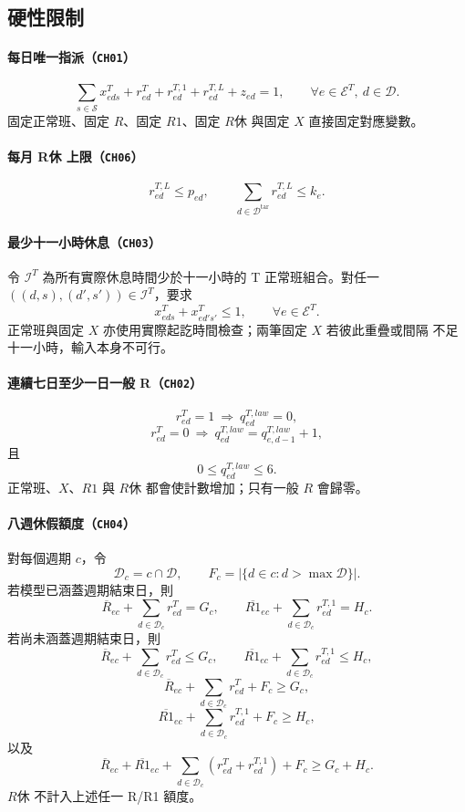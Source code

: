 \documentclass[a4paper,12pt]{article}
\begin{document}
\subsection{硬性限制}

\paragraph{每日唯一指派（\texttt{CH01}）}
\[
  \sum_{s\in\mathcal{S}}x^{T}_{eds}
  +r^{T}_{ed}+r^{T,1}_{ed}+r^{T,L}_{ed}+z_{ed}=1,
  \qquad
  \forall e\in\mathcal{E}^{T},\ d\in\mathcal{D}.
\]
固定正常班、固定 \(R\)、固定 \(R1\)、固定 \(R休\) 與固定 \(X\) 直接固定對應變數。

\paragraph{每月 R休 上限（\texttt{CH06}）}
\[
  r^{T,L}_{ed}\leq p_{ed},
  \qquad
  \sum_{d\in\mathcal{D}^{\mathrm{tar}}}r^{T,L}_{ed}\leq k_e.
\]

\paragraph{最少十一小時休息（\texttt{CH03}）}
令 \(\mathcal{I}^{T}\) 為所有實際休息時間少於十一小時的 T 正常班組合。對任一
\(((d,s),(d',s'))\in\mathcal{I}^{T}\)，要求
\[
  x^{T}_{eds}+x^{T}_{ed's'}\leq1,
  \qquad
  \forall e\in\mathcal{E}^{T}.
\]
正常班與固定 \(X\) 亦使用實際起訖時間檢查；兩筆固定 \(X\) 若彼此重疊或間隔
不足十一小時，輸入本身不可行。

\paragraph{連續七日至少一日一般 R（\texttt{CH02}）}
\[
  r^{T}_{ed}=1
  \ \Longrightarrow\ 
  q^{T,law}_{ed}=0,
\]
\[
  r^{T}_{ed}=0
  \ \Longrightarrow\ 
  q^{T,law}_{ed}=q^{T,law}_{e,d-1}+1,
\]
且
\[
  0\leq q^{T,law}_{ed}\leq6.
\]
正常班、\(X\)、\(R1\) 與 \(R休\) 都會使計數增加；只有一般 \(R\) 會歸零。

\paragraph{八週休假額度（\texttt{CH04}）}
對每個週期 \(c\)，令
\[
  \mathcal{D}_c=c\cap\mathcal{D},
  \qquad
  F_c=\left|\{d\in c:d>\max\mathcal{D}\}\right|.
\]
若模型已涵蓋週期結束日，則
\[
  \overline{R}_{ec}+\sum_{d\in\mathcal{D}_c}r^{T}_{ed}=G_c,
  \qquad
  \overline{R1}_{ec}+\sum_{d\in\mathcal{D}_c}r^{T,1}_{ed}=H_c.
\]
若尚未涵蓋週期結束日，則
\[
  \overline{R}_{ec}+\sum_{d\in\mathcal{D}_c}r^{T}_{ed}\leq G_c,
  \qquad
  \overline{R1}_{ec}+\sum_{d\in\mathcal{D}_c}r^{T,1}_{ed}\leq H_c,
\]
\[
  \overline{R}_{ec}+\sum_{d\in\mathcal{D}_c}r^{T}_{ed}+F_c\geq G_c,
\]
\[
  \overline{R1}_{ec}+\sum_{d\in\mathcal{D}_c}r^{T,1}_{ed}+F_c\geq H_c,
\]
以及
\[
  \overline{R}_{ec}+\overline{R1}_{ec}
  +\sum_{d\in\mathcal{D}_c}\left(r^{T}_{ed}+r^{T,1}_{ed}\right)
  +F_c
  \geq G_c+H_c.
\]
\(R休\) 不計入上述任一 R/R1 額度。
\end{document}
